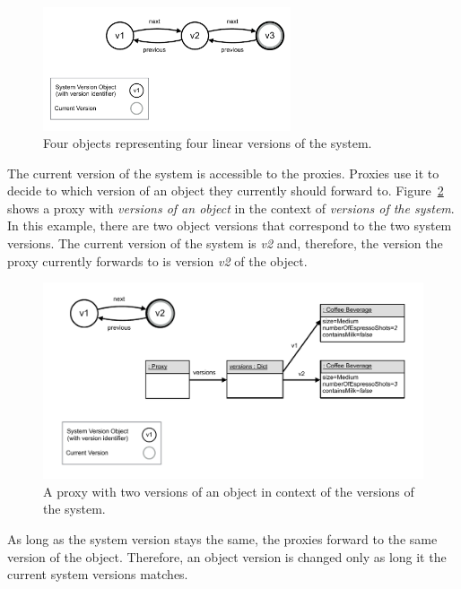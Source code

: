 \begin{figure}[h]
    \centering
    \includegraphics[width=0.65\textwidth]{figures/4_approach/8_systemVersions.pdf}
    \caption{Four objects representing four linear versions of the system.}
    \label{fig:SystemVersions}
\end{figure}

The current version of the system is accessible to the proxies.
Proxies use it to decide to which version of an object they currently should forward to.
Figure~\ref{fig:ProxyUseSystemVersion} shows a proxy with \emph{versions of an object} in the context of \emph{versions of the system}.
In this example, there are two object versions that correspond to the two system versions.
The current version of the system is \emph{v2} and, therefore, the version the proxy currently forwards to is version \emph{v2} of the object.

\begin{figure}[h]
    \centering
    \includegraphics[width=\textwidth]{figures/4_approach/9_proxyUsesSystemVersion.pdf}
    \caption{A proxy with two versions of an object in context of the versions of the system.}
    \label{fig:ProxyUseSystemVersion}
\end{figure}

As long as the system version stays the same, the proxies forward to the same version of the object.
Therefore, an object version is changed only as long it the current system versions matches.

